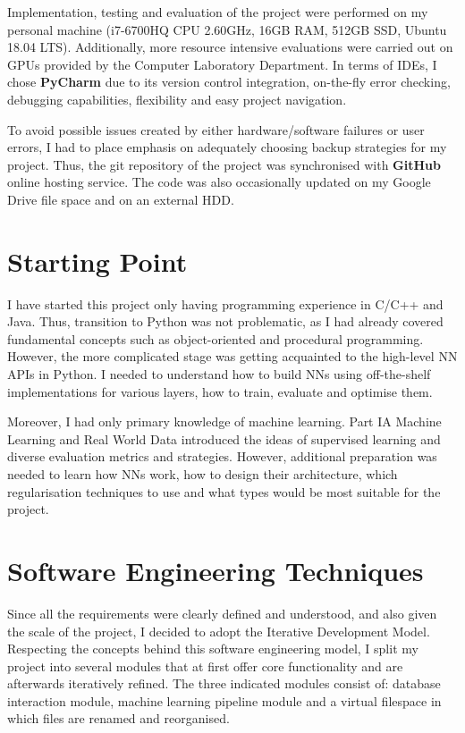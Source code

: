 Implementation, testing and evaluation of the project were performed on my personal machine (i7-6700HQ CPU 2.60GHz, 16GB RAM, 512GB SSD,  Ubuntu 18.04 LTS). Additionally, more resource intensive evaluations were carried out on GPUs provided by the Computer Laboratory Department. In terms of IDEs, I chose \textbf{PyCharm} due to its version control integration, on-the-fly error checking, debugging capabilities, flexibility and easy project navigation. \smallskip

To avoid possible issues created by either hardware/software failures or user errors, I had to place emphasis on adequately choosing backup strategies for my project. Thus, the git repository of the project was synchronised with \textbf{GitHub} online hosting service. The code was also occasionally updated on my Google Drive file space and on an external HDD. \\

\section{Starting Point}

I have started this project only having programming experience in C/C++ and Java. Thus, transition to Python was not problematic, as I had already covered fundamental concepts such as object-oriented and procedural programming. However, the more complicated stage was getting acquainted to the high-level NN APIs in Python. I needed to understand how to build NNs using off-the-shelf implementations for various layers, how to train, evaluate and optimise them. \smallskip

Moreover, I had only primary knowledge of machine learning. Part IA Machine Learning and Real World Data introduced the ideas of supervised learning and diverse evaluation metrics and strategies. However, additional preparation was needed to learn how NNs work, how to design their architecture, which regularisation techniques to use and what types would be most suitable for the project. \\

\section{Software Engineering Techniques}

Since all the requirements were clearly defined and understood, and also given the scale of the project, I decided to adopt the Iterative Development Model. Respecting the concepts behind this software engineering model, I split my project into several modules that at first offer core functionality and are afterwards iteratively refined. The three indicated modules
consist of: database interaction module, machine learning pipeline module and a virtual filespace in which files are renamed and reorganised. \smallskip

